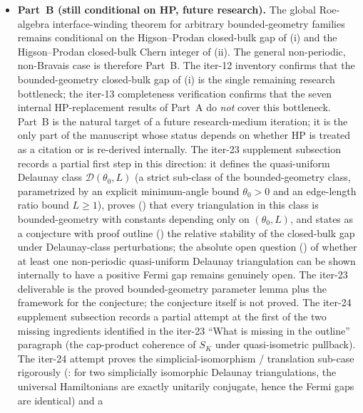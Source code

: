 \documentclass[11pt]{article}
\numberwithin{equation}{section}
\theoremstyle{definition}
\theoremstyle{remark}
\begin{document}
\begin{itemize}[leftmargin=2em]
\item \textbf{Part~B (still conditional on HP, future research).} The global Roe-algebra
interface-winding theorem  for arbitrary bounded-geometry
families remains conditional on the Higson--Prodan closed-bulk gap of
(i) and the Higson--Prodan closed-bulk Chern integer of
(ii). The general non-periodic, non-Bravais case is therefore Part~B.
The iter-12 inventory  confirms that the bounded-geometry
closed-bulk gap of (i) is the single remaining research bottleneck;
the iter-13 completeness verification  confirms that the
seven internal HP-replacement results of Part~A do \emph{not} cover this bottleneck. Part~B
is the natural target of a future research-medium iteration; it is the only part of the
manuscript whose status depends on whether HP is treated as a citation or is re-derived
internally. The iter-23 supplement subsection
 records a partial first step in this
direction: it defines the quasi-uniform Delaunay class
\(\mathcal D(\theta_0,L)\) (a strict sub-class of the bounded-geometry
class, parametrized by an explicit minimum-angle bound \(\theta_0>0\)
and an edge-length ratio bound \(L\ge 1\)), proves
() that every triangulation in this
class is bounded-geometry with constants depending only on
\((\theta_0,L)\), and states as a conjecture with proof outline
() the relative stability
of the closed-bulk gap under Delaunay-class perturbations; the
absolute open question () of
whether at least one non-periodic quasi-uniform Delaunay triangulation
can be shown internally to have a positive Fermi gap remains genuinely
open. The iter-23 deliverable is the proved bounded-geometry parameter
lemma plus the framework for the conjecture; the conjecture itself is
not proved. The iter-24 supplement subsection
 records a partial attempt at
the first of the two missing ingredients identified in the iter-23
``What is missing in the outline'' paragraph (the cap-product coherence
of \(S_K\) under quasi-isometric pullback). The iter-24 attempt proves
the simplicial-isomorphism / translation sub-case rigorously
(: for two simplicially
isomorphic Delaunay triangulations, the universal Hamiltonians are
exactly unitarily conjugate, hence the Fermi gaps are identical) and a

\end{itemize}
\end{document}
